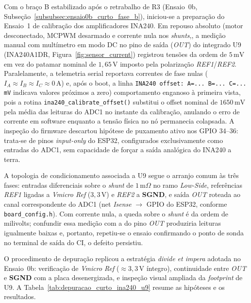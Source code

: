 Com o braço B estabilizado após o retrabalho de R3 (Ensaio~0b, Subseção~\ref{subsubsec:ensaio0b_curto_fase_b}), iniciou-se a preparação do Ensaio~1 de calibração dos amplificadores INA240. Em repouso absoluto (motor desconectado, MCPWM desarmado e corrente nula nos \textit{shunts},, a medição manual com multímetro em modo DC no pino de saída (\textit{OUT}) do integrado U9 (INA240A1DR, Figura~\ref{fig:sensor_current}) registrou tensões da ordem de $5\,\text{mV}$ em vez do patamar nominal de $1{,}65\,\text{V}$ imposto pela polarização \textit{REF1}/\textit{REF2}. Paralelamente, a telemetria serial reportava correntes de fase nulas ($I_A \approx I_B \approx I_C \approx 0\,\text{A}$) e, após o boot, a linha \texttt{INA240 offset: A=... B=... C=... mV} indicava valores próximos a zero) comportamento enganoso à primeira vista, pois a rotina \texttt{ina240\_calibrate\_offset()} substitui o offset nominal de $1650\,\text{mV}$ pela média das leituras do ADC1 no instante da calibração, anulando o erro de corrente em software enquanto a tensão física no nó permanecia colapsada. A inspeção do firmware descartou hipótese de puxamento ativo nos GPIO 34--36: trata-se de pinos \textit{input-only} do ESP32, configurados exclusivamente como entradas do ADC1, sem capacidade de forçar a saída analógica do INA240 a terra.

A topologia de condicionamento associada a U9 segue o arranjo comum às três fases: entradas diferenciais sobre o \textit{shunt} de $1\,\text{m}\Omega$ no ramo \textit{Low-Side}, referências \textit{REF1} ligadas a \textit{Vmicro Ref} ($3{,}3\,\text{V}$) e \textit{REF2} a \textbf{SGND}, e saída \textit{OUT} roteada ao canal correspondente do ADC1 (net \textit{Isense} $\rightarrow$ GPIO do ESP32, conforme \texttt{board\_config.h}). Com corrente nula, a queda sobre o \textit{shunt} é da ordem de milivolts; confundir essa medição com a do pino \textit{OUT} produziria leituras igualmente baixas e, portanto, repetiu-se o ensaio confirmando o ponto de sonda no terminal de saída do CI, o defeito persistiu.

O procedimento de depuração replicou a estratégia \textit{divide et impera} adotada no Ensaio~0b: verificação de \textit{Vmicro Ref} ($\approx 3{,}3\,\text{V}$ íntegro), continuidade entre \textit{OUT} e \textbf{SGND} com a placa desenergizada, e inspeção visual ampliada da \textit{footprint} de U9. A Tabela~\ref{tab:depuracao_curto_ina240_u9} resume as hipóteses e os resultados.

